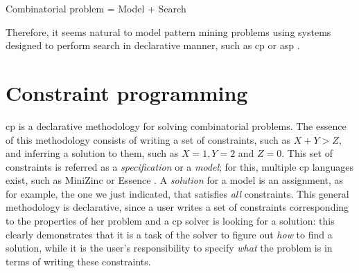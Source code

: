 \begin{center}
  Combinatorial problem = Model + Search
\end{center}

Therefore, it seems natural to model pattern mining problems 
using systems designed to perform search in declarative manner, such
as \acrlong{cp} \parencite{handbookcp} or \acrlong{asp}
\parencite{whatisasp}. %

\section{Constraint programming} 
\acrlong{cp} is a declarative methodology for solving combinatorial
problems. The essence of this methodology consists of writing a set of
constraints, such as $X + Y > Z$, and inferring a solution to them, such
as $X = 1, Y = 2$ and $Z = 0$. This set of constraints is referred as
a \textit{specification} or a \textit{model}; for this, multiple \acrlong{cp}
languages exist, such as MiniZinc \parencite{minizinc} or Essence
\parencite{essence}. A \textit{solution} for
a model is an assignment, as for example, the one we just indicated, that satisfies
\textit{all} constraints. This general methodology is declarative,
since a user writes a set of constraints corresponding to the
properties of her problem and a \acrshort{cp} solver is looking for a
solution: this clearly demonstrates that it is a task of the solver
to figure out \textit{how} to find a solution, while it is the user's
responsibility to specify \textit{what} the problem is in terms of
writing these constraints.

